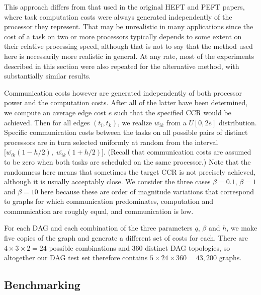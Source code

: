 \documentclass[12pt]{article}
\begin{document}
This approach differs from that used in the original HEFT \cite{topcuoglu2002performance} and PEFT \cite{arabnejad14} papers, where task computation costs were always generated independently of the processor they represent. That may be unrealistic in many applications since the cost of a task on two or more processors typically depends to some extent on their relative processing speed, although that is not to say that the method used here is necessarily more realistic in general. At any rate, most of the experiments described in this section were also repeated for the alternative method, with substantially similar results.

Communication costs however are generated independently of both processor power and the computation costs. After all of the latter have been determined, we compute an average edge cost $\overline{e}$ such that the specified CCR would be achieved. Then for all edges $(t_i, t_k)$, we realize $\overline{w_{ik}}$ from a $U[0, 2\overline{e}]$ distribution. Specific communication costs between the tasks on all possible pairs of distinct processors are in turn selected uniformly at random from the interval $\big[ \overline{w_{ik}} (1 - h/2), \; \overline{w_{ik}} (1 + h/2)   \big]$.
(Recall that communication costs are assumed to be zero when both tasks are scheduled on the same processor.) Note that the randomness here means that sometimes the target CCR is not precisely achieved, although it is usually acceptably close. We consider the three cases $\beta = 0.1$, $\beta = 1$ and $\beta = 10$ here because these are order of magnitude variations that correspond to graphs for which communication predominates, computation and communication are roughly equal, and communication is low.   

For each DAG and each combination of the three parameters $q$, $\beta$ and $h$, we make five copies of the graph and generate a different set of costs for each. There are $4 \times 3 \times 2 = 24$ possible combinations and $360$ distinct DAG topologies, so altogether our DAG test set therefore contains $5 \times 24 \times 360 = 43,200$ graphs. 


\subsection{Benchmarking}
\label{subsect.benchmarking}
\end{document}
